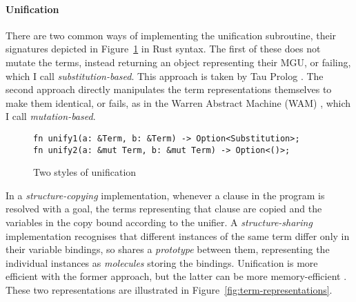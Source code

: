 \paragraph{Unification} There are two common ways of implementing the unification subroutine, their signatures depicted in Figure~\ref{fig:unification-impl} in Rust syntax. The first of these does not mutate the terms, instead returning an object representing their MGU, or failing, which I call \emph{substitution-based}. This approach is taken by Tau Prolog \cite{riazaTauPrologProlog2024}. The second approach directly manipulates the term representations themselves to make them identical, or fails, as in the Warren Abstract Machine (WAM) \cite{warrenAbstractPrologInstruction1983}, which I call \emph{mutation-based}.

\begin{figure}[H]
\centering
\begin{verbatim}
fn unify1(a: &Term, b: &Term) -> Option<Substitution>;
fn unify2(a: &mut Term, b: &mut Term) -> Option<()>;
\end{verbatim}
\caption{Two styles of unification}
\label{fig:unification-impl}
\end{figure}

In a \emph{structure-copying} implementation, whenever a clause in the program is resolved with a goal, the terms representing that clause are copied and the variables in the copy bound according to the unifier. A \emph{structure-sharing} implementation recognises that different instances of the same term differ only in their variable bindings, so shares a \emph{prototype} between them, representing the individual instances as \emph{molecules} storing the bindings. Unification is more efficient with the former approach, but the latter can be more memory-efficient \cite{linewtermrepresentation1998}. These two representations are illustrated in Figure~\ref{fig:term-representations}.

